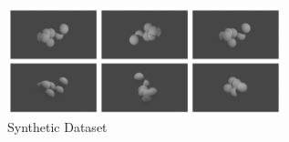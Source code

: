 \begin{itemize}
        \begin{figure}[H]
        \centering
        \includegraphics[width=0.71\textwidth]{img/Synthetic Dataset 1.png}
        \caption{Synthetic Dataset \cite{Rakib2024}}\label{fig:Synthetic Dataset}
        \end{figure}
        
\end{itemize}